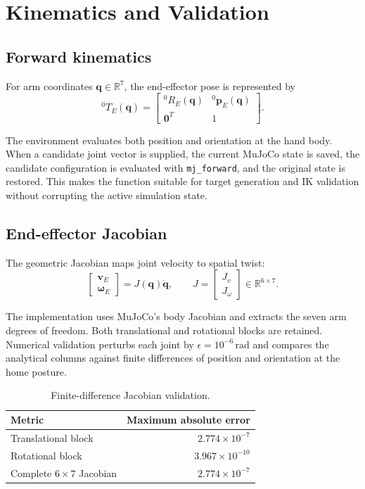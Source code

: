 \documentclass[12pt,a4paper]{article}
\begin{document}
\clearpage
\section{Kinematics and Validation}
\subsection{Forward kinematics}
For arm coordinates $\bm q\in\mathbb{R}^7$, the end-effector pose is represented by
\begin{equation}
{}^{0}\!T_E(\bm q)=
\begin{bmatrix}
{}^{0}\!R_E(\bm q) & {}^{0}\!\bm p_E(\bm q)\\
\bm 0^T & 1
\end{bmatrix}.
\end{equation}

The environment evaluates both position and orientation at the hand body. When a candidate joint vector is supplied, the current MuJoCo state is saved, the candidate configuration is evaluated with \texttt{mj\_forward}, and the original state is restored. This makes the function suitable for target generation and IK validation without corrupting the active simulation state.



\subsection{End-effector Jacobian}
The geometric Jacobian maps joint velocity to spatial twist:
\begin{equation}
\begin{bmatrix}\bm v_E\\\bm\omega_E\end{bmatrix}
=J(\bm q)\dot{\bm q},
\qquad
J=\begin{bmatrix}J_v\\J_\omega\end{bmatrix}\in\mathbb{R}^{6\times7}.
\end{equation}

The implementation uses MuJoCo's body Jacobian and extracts the seven arm degrees of freedom. Both translational and rotational blocks are retained. Numerical validation perturbs each joint by $\epsilon=10^{-6}\,\mathrm{rad}$ and compares the analytical columns against finite differences of position and orientation at the home posture.

\begin{table}[!htbp]
\centering
\caption{Finite-difference Jacobian validation.}
\begin{tabular}{lr}
\toprule
Metric & Maximum absolute error\\
\midrule
Translational block & $2.774\times10^{-7}$\\
Rotational block & $3.967\times10^{-10}$\\
Complete $6\times7$ Jacobian & $2.774\times10^{-7}$\\
\bottomrule
\end{tabular}
\end{table}
\end{document}
